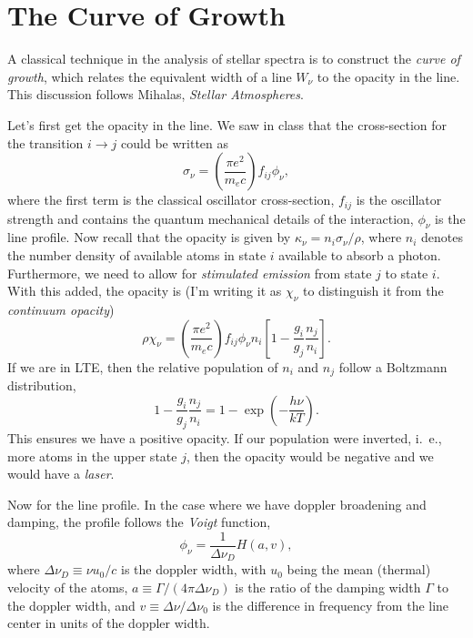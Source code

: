 \section{The Curve of Growth}

A classical technique in the analysis of stellar spectra is to construct the \emph{curve of growth}, which relates the equivalent width of a line $W_{\nu}$ to the opacity in the line. This discussion follows Mihalas, \emph{Stellar Atmospheres}.

Let's first get the opacity in the line.  We saw in class that the cross-section for the transition $i\to j$ could be written as 
\begin{equation}\label{e.cross-section}
\sigma_{\nu} = \left(\frac{\pi e^{2}}{m_{e}c}\right)f_{ij}\phi_{\nu},
\end{equation}
where the first term is the classical oscillator cross-section, $f_{ij}$ is the oscillator strength and contains the quantum mechanical details of the interaction, $\phi_{\nu}$ is the line profile.  Now recall that the opacity is given by $\kappa_{\nu} = n_{i}\sigma_{\nu}/\rho$, where $n_{i}$ denotes the number density of available atoms in state $i$ available to absorb a photon.  Furthermore, we need to allow for \emph{stimulated emission} from state $j$ to state $i$. With this added, the opacity is (I'm writing it as $\chi_{\nu}$ to distinguish it from the \emph{continuum opacity})
\begin{equation}\label{e.opacity}
\rho\chi_{\nu} = \left(\frac{\pi e^{2}}{m_{e}c}\right)f_{ij}\phi_{\nu}n_{i}\left[1 - \frac{g_{i}}{g_{j}}\frac{n_{j}}{n_{i}}\right].
\end{equation}
If we are in LTE, then the relative population of $n_{i}$ and $n_{j}$ follow a Boltzmann distribution,
\[ 1 - \frac{g_{i}}{g_{j}}\frac{n_{j}}{n_{i}} = 1- \exp\left(-\frac{h\nu}{kT}\right). \]
This ensures we have a positive opacity. If our population were inverted, i.~e., more atoms in the upper state $j$, then the opacity would be negative and we would have a \emph{laser}.

Now for the line profile.  In the case where we have doppler broadening and damping, the profile follows the \emph{Voigt} function,
\begin{equation}\label{e.voigt} \phi_{\nu} = \frac{1}{\Delta \nu_{D}}H(a,v), \end{equation}
where $\Delta\nu_{D} \equiv \nu u_{0}/c$ is the doppler width, with $u_{0}$ being the mean (thermal) velocity of the atoms, $a \equiv \Gamma/(4\pi\Delta\nu_{D})$ is the ratio of the damping width $\Gamma$ to the doppler width, and $v \equiv \Delta\nu/\Delta\nu_{0}$ is the difference in frequency from the line center in units of the doppler width.

